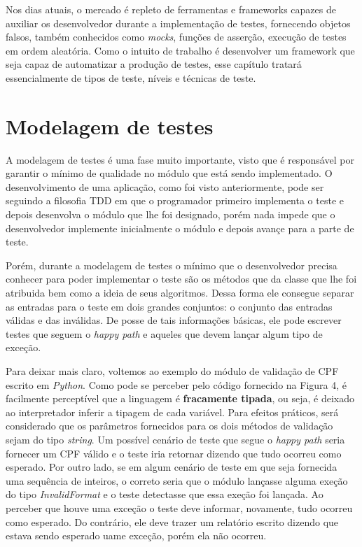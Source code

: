 \documentclass[
    12pt,       %
    openright,      %
    twoside,      %
    a4paper,      %
    english,      %
    french,       %
    spanish,      %
    brazil,       %
    ]{abntex2}
\begin{document}
      Nos dias atuais, o mercado é repleto de ferramentas e frameworks capazes de
      auxiliar os desenvolvedor durante a implementação de testes, fornecendo
      objetos falsos, também conhecidos como \textit{mocks}, funções de asserção,
      execução de testes em ordem aleatória. Como o intuito de trabalho é desenvolver
      um framework que seja capaz de automatizar a produção de testes, esse capítulo
      tratará essencialmente de tipos de teste, níveis e técnicas de teste.

      \section{Modelagem de testes}
          A modelagem de testes é uma fase muito importante, visto que é responsável
          por garantir o mínimo de qualidade no módulo que está sendo implementado.
          O desenvolvimento de uma aplicação, como foi visto anteriormente, pode ser
          seguindo a filosofia TDD em que o programador primeiro implementa o teste
          e depois desenvolva o módulo que lhe foi designado, porém nada impede que
          o desenvolvedor implemente inicialmente o módulo e depois avançe para a
          parte de teste.

          Porém, durante a modelagem de testes o mínimo que o desenvolvedor precisa
          conhecer para poder implementar o teste são os métodos que da classe que
          lhe foi atribuida bem como a ideia de seus algoritmos. Dessa forma ele
          consegue separar as entradas para o teste em dois grandes conjuntos: o
          conjunto das entradas válidas e das inválidas. De posse de tais informações
          básicas, ele pode escrever testes que seguem o \textit{happy path} e aqueles
          que devem lançar algum tipo de exceção.

          Para deixar mais claro, voltemos ao exemplo do módulo de validação de CPF
          escrito em \textit{Python}. Como pode se perceber pelo código fornecido na
          Figura 4, é facilmente perceptível que a linguagem é \textbf{fracamente tipada},
          ou seja, é deixado ao interpretador inferir a tipagem de cada variável. Para
          efeitos práticos, será considerado que os parâmetros fornecidos para os dois
          métodos de validação sejam do tipo \textit{string}. Um possível cenário de teste
          que segue o \textit{happy path} seria fornecer um CPF válido e o teste iria
          retornar dizendo que tudo ocorreu como esperado. Por outro lado, se em algum
          cenário de teste em que seja fornecida uma sequência de inteiros, o correto
          seria que o módulo lançasse alguma exeção do tipo \textit{InvalidFormat} e o
          teste detectasse que essa exeção foi lançada. Ao perceber que houve uma exceção
          o teste deve informar, novamente, tudo ocorreu como esperado. Do contrário, ele
          deve trazer um relatório escrito dizendo que estava sendo esperado uame exceção,
          porém ela não ocorreu.
\end{document}
